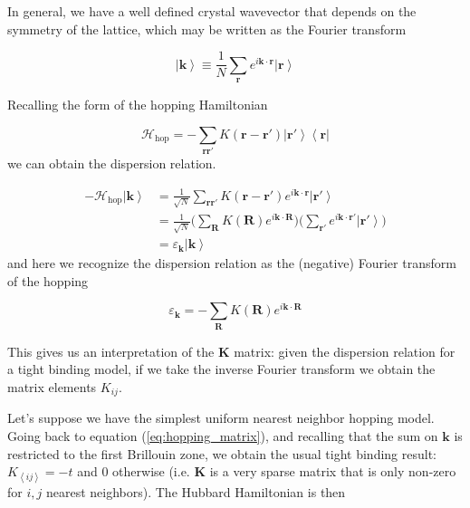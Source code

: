 \documentclass[10pt, twocolumn, twoside]{article}
\begin{document}
In general, we have a well defined crystal wavevector that depends on the symmetry of the lattice, which may be written as the Fourier transform

\begin{equation}
\left| \bm k \right\rangle \equiv \frac{1}{N} \sum_{\bm r} e^{i\bm k \cdot \bm r} \left| \bm r \right\rangle
\end{equation}

Recalling the form of the hopping Hamiltonian

\begin{equation}
\mathcal{H}_{\text{hop}} = - \sum_{\bm r \bm r'} K (\bm r - \bm r') \left| \bm r' \right\rangle \left\langle \bm r \right|
\end{equation}
we can obtain the dispersion relation.

\begin{equation}
\begin{split}
- \mathcal{H}_{\text{hop}} \left| \bm k \right\rangle &= \frac{1}{\sqrt{N}} \sum_{\bm r \bm r'} K ( \bm r - \bm r' ) e^{i \bm k \cdot \bm r} \left| \bm r' \right \rangle \\
&= \frac{1}{\sqrt{N}} \bigg( \sum_{\bm R} K(\bm R) e^{i\bm k \cdot \bm R} \bigg) \bigg( \sum_{\bm r'} e^{i\bm k \cdot \bm r'} \left| \bm r' \right\rangle \bigg) \\
& = \varepsilon_{\bm k} \left| \bm k \right\rangle
\end{split}
\end{equation}
and here we recognize the dispersion relation as the (negative) Fourier transform of the hopping

\begin{equation}
\varepsilon_{\bm k} = - \sum_{\bm R} K(\bm R) e^{i\bm k \cdot \bm R} 
\end{equation}

This gives us an interpretation of the $\bm K$ matrix: given the dispersion relation for a tight binding model, if we take the inverse Fourier transform we obtain the matrix elements $K_{i j}$.

Let's suppose we have the simplest uniform nearest neighbor hopping model. Going back to equation (\ref{eq:hopping_matrix}), and recalling that the sum on $\bm k$ is restricted to the first Brillouin zone, we obtain the usual tight binding result: $K_{\left\langle i j \right\rangle} = - t$ and $0$ otherwise (i.e. $\bm K$ is a very sparse matrix that is only non-zero for $i, j$ nearest neighbors). The Hubbard Hamiltonian is then
\end{document}
